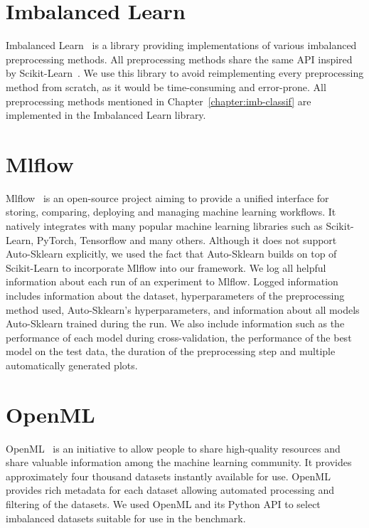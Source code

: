 \section{Imbalanced Learn}
\label{section:imblearn}

Imbalanced Learn~\cite{imblearn} is a library providing implementations of various imbalanced
preprocessing methods. All preprocessing methods share the same API inspired by
Scikit-Learn~\cite{sklearn}. We use this library to avoid reimplementing every preprocessing method
from scratch, as it would be time-consuming and error-prone. All preprocessing methods mentioned in
Chapter~\ref{chapter:imb-classif} are implemented in the Imbalanced Learn library.


\section{Mlflow}
\label{section:mlflow}

Mlflow~\cite{mlflow} is an open-source project aiming to provide a unified interface for storing,
comparing, deploying and managing machine learning workflows. It natively integrates with many
popular machine learning libraries such as Scikit-Learn, PyTorch, Tensorflow and many others.
Although it does not support Auto-Sklearn explicitly, we used the fact that Auto-Sklearn builds on
top of Scikit-Learn to incorporate Mlflow into our framework. We log all helpful information about
each run of an experiment to Mlflow. Logged information includes information about the dataset,
hyperparameters of the preprocessing method used, Auto-Sklearn's hyperparameters, and information
about all models Auto-Sklearn trained during the run. We also include information such as the
performance of each model during cross-validation, the performance of the best model on the test
data, the duration of the preprocessing step and multiple automatically generated plots.


\section{OpenML}
\label{section:openml}

OpenML~\cite{openml} is an initiative to allow people to share high-quality resources and share
valuable information among the machine learning community. It provides approximately four thousand
datasets instantly available for use. OpenML provides rich metadata for each dataset allowing
automated processing and filtering of the datasets. We used OpenML and its Python API to select
imbalanced datasets suitable for use in the benchmark.
